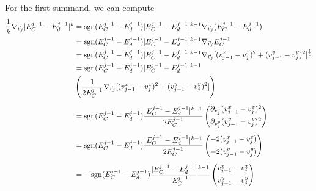 \begin{proposition}
	For the first summand, we can compute 
	\begin{align*}
		\frac{1}{k} \nabla_{\vec{v}_{j}} |E^{j-1}_{C} - E^{j-1}_d|^k 
		&= \operatorname{sgn}(E^{j-1}_C - E^{j-1}_d) |E^{j-1}_C - E^{j-1}_d|^{k-1} \nabla_{\vec{v}_j} (E^{j-1}_C - E^{j-1}_d) \\
		&= \operatorname{sgn}(E^{j-1}_C - E^{j-1}_d) |E^{j-1}_C - E^{j-1}_d|^{k-1} \nabla_{\vec{v}_j} E^{j-1}_C \\
		&= \operatorname{sgn}(E^{j-1}_C - E^{j-1}_d) |E^{j-1}_C - E^{j-1}_d|^{k-1} \nabla_{\vec{v}_j} [(v_{j-1}^{x} - v_{j}^{x})^2 + (v_{j-1}^{y} - v_{j}^{y})^2]^{\frac{1}{2}}\\
		&= \operatorname{sgn}(E^{j-1}_C - E^{j-1}_d) |E^{j-1}_C - E^{j-1}_d|^{k-1}    \\
		&\left(\frac{1}{2 E^{j-1}_C} \nabla_{\vec{v}_j} [(v_{j-1}^{x} - v_{j}^{x})^2 + (v_{j-1}^{y} - v_{j}^{y})^2]\right) \\[0.5em] 
		&= \operatorname{sgn}(E^{j-1}_C - E^{j-1}_d) \frac{|E^{j-1}_C - E^{j-1}_d|^{k-1}}{2 E^{j-1}_C} \begin{pmatrix}
			\partial_{v_{j}^{x}} (v_{j-1}^{x} - v_{j}^{x})^2 \\[0.5em]
			\partial_{v_{j}^{y}} (v_{j-1}^{y} - v_{j}^{y})^2
		\end{pmatrix} \\[0.5em]
		&= \operatorname{sgn}(E^{j-1}_C - E^{j-1}_d) \frac{|E^{j-1}_C - E^{j-1}_d|^{k-1}}{2 E^{j-1}_C} \begin{pmatrix}
			 -2(v_{j-1}^{x} - v_{j}^{x}) \\[0.5em]
			 -2(v_{j-1}^{y} - v_{j}^{y})
		\end{pmatrix} \\[0.5em] 
		&= - \operatorname{sgn}(E^{j-1}_C - E^{j-1}_d) \frac{ |E^{j-1}_C - E^{j-1}_d|^{k-1}}{E^{j-1}_C} \begin{pmatrix}
				v_{j-1}^{x} - v_{j}^{x} \\[0.5em]
				v_{j-1}^{y} - v_{j}^{y}
		\end{pmatrix}
	\end{align*}



\end{proposition}
